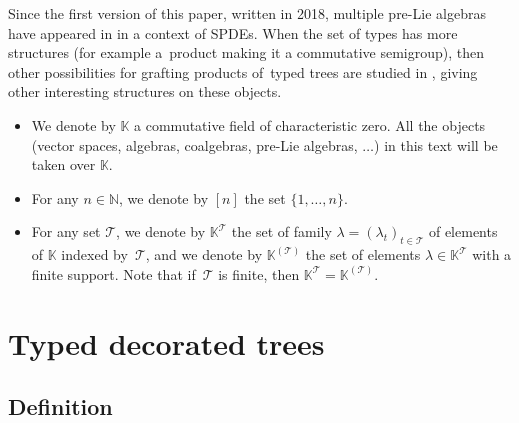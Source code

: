 \documentclass[10pt,a4paper]{amsart}
\numberwithin{equation}{section}
\newcommand{\K}{\mathbb{K}}
\newcommand{\T}{\mathcal{T}}
\begin{document}
Since the first version of this paper, written in 2018, multiple pre-Lie algebras have appeared in
\cite{BCCH,BrunedManchon} in a context of SPDEs. When the set of types has more structures (for example a~product
making it a commutative semigroup), then other possibilities for grafting products of~typed trees
are studied in \cite{FoissyPrelie2,ManchonZhang,GaoGuoZhang}, giving other interesting structures on these objects.

\begin{Notation}\qquad
\begin{itemize}\itemsep=0pt
\item We denote by $\K$ a commutative field of characteristic zero. All the objects (vector spaces, algebras,
 coalgebras, pre-Lie algebras, $\dots$)
in this text will be taken over $\K$.
\item For any $n\in \mathbb{N}$, we denote by $[n]$ the set $\{1,\dots,n\}$.
\item For any set $\T$, we denote by $\K^\T$ the set of family $\lambda=(\lambda_t)_{t\in \T}$ of elements of $\K$
indexed by~$\T$, and we denote by $\K^{(\T)}$ the set of elements $\lambda\in \K^\T$ with a finite support.
Note that if~$\T$ is finite, then $\K^\T=\K^{(\T)}$.
\end{itemize}
\end{Notation}

\section{Typed decorated trees}

\subsection{Definition}
\end{document}
